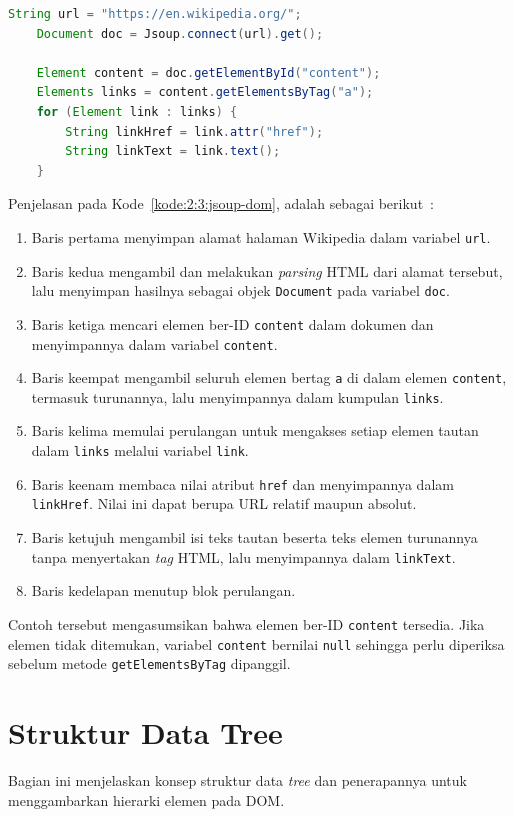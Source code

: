 \begin{lstlisting}[language=java, caption=Menggunakan metode DOM setelah \textit{parsing} HTML ke dokumen, label=kode:2:3:jsoup-dom]
	String url = "https://en.wikipedia.org/";
	Document doc = Jsoup.connect(url).get();

	Element content = doc.getElementById("content");
	Elements links = content.getElementsByTag("a");
	for (Element link : links) {
		String linkHref = link.attr("href");
		String linkText = link.text();
	}
\end{lstlisting}

Penjelasan pada Kode~\ref{kode:2:3:jsoup-dom}, adalah sebagai berikut~\cite{jsoup:26:jsoup}:
\begin{enumerate}[itemsep=0mm]
    \item Baris pertama menyimpan alamat halaman Wikipedia dalam variabel \texttt{url}.
    \item Baris kedua mengambil dan melakukan \textit{parsing} HTML dari alamat tersebut, lalu menyimpan hasilnya sebagai objek \texttt{Document} pada variabel \texttt{doc}.
    \item Baris ketiga mencari elemen ber-ID \texttt{content} dalam dokumen dan menyimpannya dalam variabel \texttt{content}.
    \item Baris keempat mengambil seluruh elemen bertag \texttt{a} di dalam elemen \texttt{content}, termasuk turunannya, lalu menyimpannya dalam kumpulan \texttt{links}.
    \item Baris kelima memulai perulangan untuk mengakses setiap elemen tautan dalam \texttt{links} melalui variabel \texttt{link}.
    \item Baris keenam membaca nilai atribut \texttt{href} dan menyimpannya dalam \texttt{linkHref}. Nilai ini dapat berupa URL relatif maupun absolut.
    \item Baris ketujuh mengambil isi teks tautan beserta teks elemen turunannya tanpa menyertakan \textit{tag} HTML, lalu menyimpannya dalam \texttt{linkText}.
    \item Baris kedelapan menutup blok perulangan.
\end{enumerate}

Contoh tersebut mengasumsikan bahwa elemen ber-ID \texttt{content} tersedia. Jika elemen tidak ditemukan, variabel \texttt{content} bernilai \texttt{null} sehingga perlu diperiksa sebelum metode \texttt{getElementsByTag} dipanggil.

\section{Struktur Data Tree}
Bagian ini menjelaskan konsep struktur data \textit{tree} dan penerapannya untuk menggambarkan hierarki elemen pada DOM.

